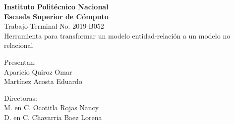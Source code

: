 \begin{titlepage}
    \begin{center}
        \vspace*{1cm}
        
        \Large
        \textbf{Instituto Politécnico Nacional}\\
        \textbf{Escuela Superior de Cómputo}\\
        
        \vspace{0.5cm}
        \LARGE
        Trabajo Terminal No. 2019-B052\\
        \vspace{1cm}
        Herramienta para transformar un modelo entidad-relación a un modelo no relacional

        \vspace{1.5cm}
        \begin{center}
            
            Presentan: \\
            Aparicio Quiroz Omar\\
            Martínez Acosta Eduardo\\
            
            \vfill
            
            Directoras:\\
            M. en C. Ocotitla Rojas Nancy\\
            D. en C. Chavarria Baez Lorena
            
            \vspace{0.8cm}
            
        \end{center}

    \end{center}
\end{titlepage}
